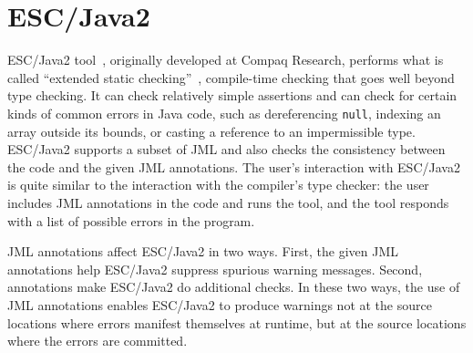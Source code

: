 \section{ESC/Java2}
\label{escjava}

ESC/Java2 tool~\cite{Flanagan-Et-Al02}, originally developed at Compaq Research,
performs what is called ``extended static
checking''~\cite{ESC:Overview,10yearsESC},
compile-time checking that goes well beyond type checking.  It can
check relatively simple assertions and can check for certain kinds of
common errors in Java code, such as dereferencing \texttt{null},
indexing an array outside its bounds, or casting a reference to an
impermissible type.  ESC/Java2 supports a subset of JML and also checks
the consistency between the code and the given JML annotations.  The
user's interaction with ESC/Java2 is quite similar to the interaction
with the compiler's type checker: the user includes JML annotations in
the code and runs the tool, and the tool responds with a list of
possible errors in the program.

JML annotations affect ESC/Java2 in two ways.  First, the given JML
annotations help ESC/Java2 suppress spurious warning messages.   Second,
annotations make ESC/\-Java2 do additional checks.  
In these two ways, the use of JML annotations enables ESC/Java2 to
produce warnings not at the source locations where errors manifest
themselves at runtime, but at the source locations where the errors
are committed.




